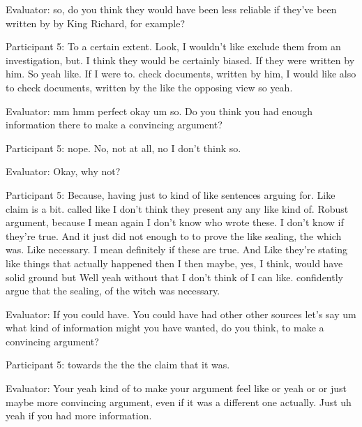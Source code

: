 \documentclass{l4proj}
\begin{document}
\begin{appendices}
Evaluator: so, do you think they would have been less reliable if they've been written by by King Richard, for example?

Participant 5: To a certain extent. Look, I wouldn't like exclude them from an investigation, but. I think they would be certainly biased. If they were written by him. So yeah like. If I were to. check documents, written by him, I would like also to check documents, written by the like the opposing view so yeah.

Evaluator: mm hmm perfect okay um so. Do you think you had enough information there to make a convincing argument?

Participant 5: nope. No, not at all, no I don't think so.

Evaluator: Okay, why not?

Participant 5: Because, having just to kind of like sentences arguing for. Like claim is a bit. called like I don't think they present any any like kind of. Robust argument, because I mean again I don't know who wrote these. I don't know if they're true. And it just did not enough to to prove the like sealing, the which was. Like necessary. I mean definitely if these are true. And Like they're stating like things that actually happened then I then maybe, yes, I think, would have solid ground but Well yeah without that I don't think of I can like. confidently argue that the sealing, of the witch was necessary.

Evaluator: If you could have. You could have had other other sources let's say um what kind of information might you have wanted, do you think, to make a convincing argument?

Participant 5: towards the the the claim that it was.

Evaluator: Your yeah kind of to make your argument feel like or yeah or or just maybe more convincing argument, even if it was a different one actually. Just uh yeah if you had more information.


\end{appendices}
\end{document}
